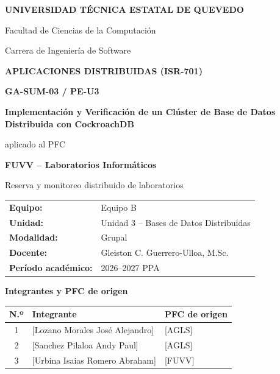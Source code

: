 \documentclass[12pt,a4paper]{article}
\begin{document}
\begin{titlepage}
  \centering

{\large\bfseries UNIVERSIDAD TÉCNICA ESTATAL DE QUEVEDO\par} \vspace{0.35cm} {\large Facultad de Ciencias de la Computación\par} {\large Carrera de Ingeniería de Software\par}

  \vfill

{\large\bfseries APLICACIONES DISTRIBUIDAS (ISR-701)\par} \vspace{0.6cm} {\Large\bfseries GA-SUM-03 / PE-U3\par} \vspace{0.35cm} {\LARGE\bfseries Implementación y Verificación de un Clúster de Base de Datos Distribuida con CockroachDB\par} \vspace{0.5cm} {\Large aplicado al PFC\par} \vspace{0.25cm} {\Large\bfseries FUVV -- Laboratorios Informáticos\par} \vspace{0.2cm} {\large Reserva y monitoreo distribuido de laboratorios\par}

  \vfill

  \renewcommand{\arraystretch}{1.3}
  \begin{tabular}{@{}>{\bfseries}p{4.1cm}p{9.0cm}@{}}
    Equipo: & Equipo B \\
    Unidad: & Unidad 3 -- Bases de Datos Distribuidas \\
    Modalidad: & Grupal \\
    Docente: & Gleiston C. Guerrero-Ulloa, M.Sc. \\
    Período académico: & 2026--2027 PPA \\
  \end{tabular}

  \vspace{0.7cm}

  {\large\bfseries Integrantes y PFC de origen\par}
  \vspace{0.25cm}
  \begin{tabular}{@{}cll@{}}
    \toprule
    \textbf{N.º} & \textbf{Integrante} & \textbf{PFC de origen} \\
    \midrule
    1 & [Lozano Morales José Alejandro] & [AGLS] \\
    2 & [Sanchez Pilaloa Andy Paul] & [AGLS] \\
    3 & [Urbina Isaias Romero Abraham] & [FUVV] \\
    \bottomrule
  \end{tabular}


\end{titlepage}
\end{document}
